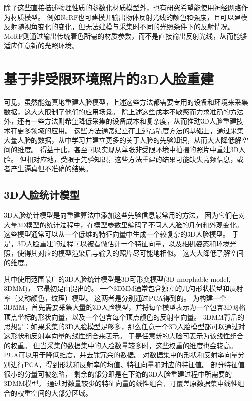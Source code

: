 除了这些直接描述物理性质的参数化材质模型外，也有研究希望能使用神经网络作为材质模型。
例如NeRF\citep{nerf}也可建模并输出物体反射光线的颜色和强度，且可以建模反射随视角变化的变化，但无法建模与采集时不同的光照条件下的反射情况。
MoRF\citep{MoRF}则通过输出传统着色所需的材质参数，而不是直接输出反射光线，从而能够适应任意新的光照环境。

\section{基于非受限环境照片的3D人脸重建}

可见，虽然能逼真地重建人脸模型，上述这些方法都需要专用的设备和环境来采集数据，这大大限制了他们的应用场景。
除上述这些成本不敏感而力求准确的方法外，还有一些方法则希望降低采集的设备成本和复杂度，从而推动3D人脸重建技术在更多领域的应用。
这些方法通常建立在上述高精度方法的基础上，通过采集大量人脸的数据，从中学习并建立更多的关于人脸的先验知识，从而大大降低解空间的维度。
得益于此，甚至可以实现从单张非受限环境中拍摄的照片中重建3D人脸\citep{danzhangtuxiangsanwei}。
但相对应地，受限于先验知识，这些方法重建的结果可能缺失高频信息，或者产生逼真但不准确的结果。

\subsection{3D人脸统计模型}

3D人脸统计模型是向重建算法中添加这些先验信息最常用的方法，
因为它们在对大量3D模型的统计过程中，在模型参数里编码了不同人人脸的几何和外观变化。
这些模型通常可以从一个低维的特征向量中生成一个较复杂的3D人脸模型。
于是，3D人脸重建的过程可以被看做估计一个特征向量，以及相机姿态和环境光照，使得其对应的模型渲染后与输入的照片尽可能地相似。
这大大降低了解空间的维度。

其中使用范围最广的3D人脸统计模型是3D可形变模型(3D morphable model, 3DMM)，
它最初是由\citet{3DMM}提出的。
一个3DMM通常包含独立的几何形状模型和反射率（又称颜色，纹理）模型。
这两者是分别通过PCA得到的。
为构建一个3DMM，首先需要采集大量的3D人脸模型，并将每个模型表示为一个包含3D网格顶点坐标的形状向量，以及一个包含每个顶点颜色的反射率向量。
3DMM背后的思想是：如果采集的3D人脸模型足够多，那么任意一个3D人脸模型都可以通过对这形状和反射率向量的线性组合来表示。
于是任意新的人脸可表示为该线性组合的权重。
但当采集的数据集中的人脸数量较多时，这些权重的维度也会较高。
PCA可以用于降低维度，并去除冗余的数据。
对数据集中的形状和反射率向量分别进行PCA，得到形状和反射率的均值、特征向量和对应的特征值。
部分特征值很小的分量可被忽略，
剩余的部分即是在下游的3D人脸重建过程中所需要的3DMM模型。
通过对数量较少的特征向量的线性组合，可覆盖原数据集中线性组合的权重空间的大部分区域。

